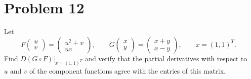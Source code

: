 \documentclass{article}
\begin{document}
\section*{Problem 12}
Let
\[
	F\begin{pmatrix}u\\v\end{pmatrix}=\begin{pmatrix}u^2+v\\uv\end{pmatrix},\qquad
	G\begin{pmatrix}x\\y\end{pmatrix}=\begin{pmatrix}x+y\\x-y\end{pmatrix},\qquad
	x=(1,1)^T.
\]
Find \(D(G\circ F)\big|_{x=(1,1)^T}\) and verify that the partial derivatives with respect to \(u\) and \(v\) of the component functions agree with the entries of this matrix.
\end{document}

